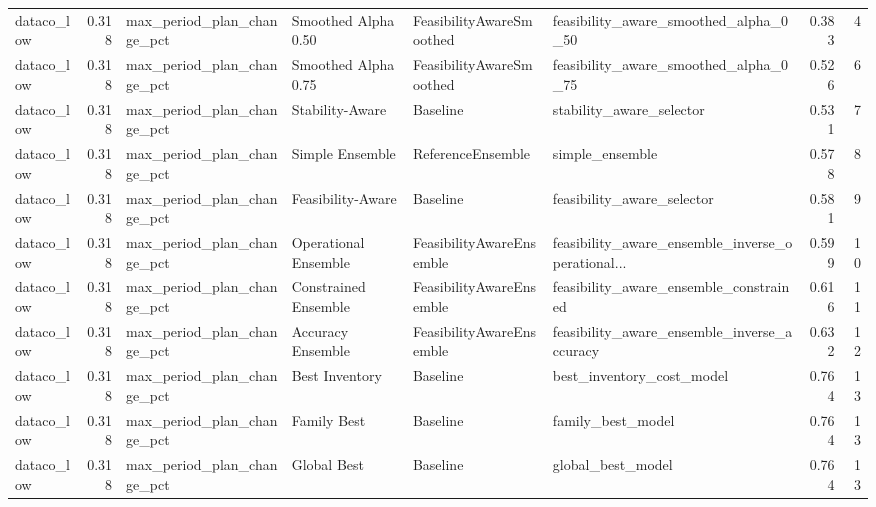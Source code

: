 \begin{table}
{\begin{tabular}{lrllllrr}
    dataco\_low &             0.318 &  max\_period\_plan\_change\_pct &   Smoothed Alpha 0.50 &  FeasibilityAwareSmoothed &              feasibility\_aware\_smoothed\_alpha\_0\_50 &         0.383 &               4 \\
    dataco\_low &             0.318 &  max\_period\_plan\_change\_pct &   Smoothed Alpha 0.75 &  FeasibilityAwareSmoothed &              feasibility\_aware\_smoothed\_alpha\_0\_75 &         0.526 &               6 \\
    dataco\_low &             0.318 &  max\_period\_plan\_change\_pct &       Stability-Aware &                  Baseline &                           stability\_aware\_selector &         0.531 &               7 \\
    dataco\_low &             0.318 &  max\_period\_plan\_change\_pct &       Simple Ensemble &         ReferenceEnsemble &                                    simple\_ensemble &         0.578 &               8 \\
    dataco\_low &             0.318 &  max\_period\_plan\_change\_pct &     Feasibility-Aware &                  Baseline &                         feasibility\_aware\_selector &         0.581 &               9 \\
    dataco\_low &             0.318 &  max\_period\_plan\_change\_pct &  Operational Ensemble &  FeasibilityAwareEnsemble &  feasibility\_aware\_ensemble\_inverse\_operational... &         0.599 &              10 \\
    dataco\_low &             0.318 &  max\_period\_plan\_change\_pct &  Constrained Ensemble &  FeasibilityAwareEnsemble &             feasibility\_aware\_ensemble\_constrained &         0.616 &              11 \\
    dataco\_low &             0.318 &  max\_period\_plan\_change\_pct &     Accuracy Ensemble &  FeasibilityAwareEnsemble &        feasibility\_aware\_ensemble\_inverse\_accuracy &         0.632 &              12 \\
    dataco\_low &             0.318 &  max\_period\_plan\_change\_pct &        Best Inventory &                  Baseline &                          best\_inventory\_cost\_model &         0.764 &              13 \\
    dataco\_low &             0.318 &  max\_period\_plan\_change\_pct &           Family Best &                  Baseline &                                  family\_best\_model &         0.764 &              13 \\
    dataco\_low &             0.318 &  max\_period\_plan\_change\_pct &           Global Best &                  Baseline &                                  global\_best\_model &         0.764 &              13 \\

\end{tabular}}
\end{table}
